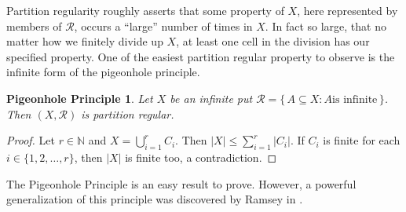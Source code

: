 \documentclass[12pt]{article}
\theoremstyle{plain}
\newtheorem*{php}{Pigeonhole Principle}
\theoremstyle{definition}
\newcommand{\bbN}{\mathbb{N}}
\newcommand{\calR}{\mathcal{R}}
\begin{document}

Partition regularity roughly asserts that some property of $X$, here
represented by members of $\calR$, occurs a ``large'' number of times
in $X$.
In fact so large, that no matter how we finitely divide up $X$, at
least one cell in the division has our specified property. 
One of the easiest partition regular property to observe is the
infinite form of the pigeonhole principle.

\begin{php}
  Let $X$ be an infinite put $\calR = \{\, A \subseteq X : \mbox{$A$
    is infinite} \,\}$.
  Then $(X, \calR)$ is partition regular.
\end{php}
\begin{proof}
  Let $r \in \bbN$ and $X = \bigcup_{i=1}^r C_i$.
  Then $|X| \le \sum_{i=1}^r |C_i|$.
  If $C_i$ is finite for each $i \in \{1, 2, \ldots, r\}$,
  then $|X|$ is finite too, a contradiction.
\end{proof}

The Pigeonhole Principle is an easy result to prove. 
However, a powerful generalization of this principle was discovered by
Ramsey in \cite[Theorem A]{Ramsey:1930uq}. 
\end{document}
